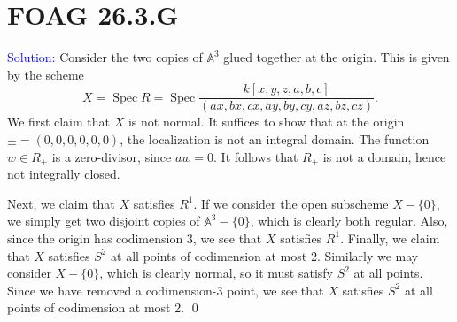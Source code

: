 \documentclass[11pt]{article}
\renewcommand{\AA}{\mathbb{A}}
\DeclareMathOperator{\Spec}{\operatorname{Spec}}
\newenvironment{solution}{\begin{trivlist}\item[]{\textcolor{blue}{Solution:}}}{\qed \end{trivlist}}
\begin{document}
\newpage

\section*{FOAG 26.3.G}

\begin{solution}
    Consider the two copies of $\AA^3$ glued together at the origin. This is given by the scheme 
    \[
        X = \Spec R = \Spec \frac{k[x,y,z,a,b,c]}{(ax, bx, cx, ay, by, cy, az, bz, cz)}.
    \]
    We first claim that $X$ is not normal. It suffices to show that at the origin $\pm = (0, 0, 0, 0, 0, 0)$, the localization is not an integral domain. The function $w \in R_{\pm}$ is a zero-divisor, since $aw = 0$. It follows that $R_{\pm}$ is not a domain, hence not integrally closed. 

    Next, we claim that $X$ satisfies $R^1$. If we consider the open subscheme $X - \{0\}$, we simply get two disjoint copies of $\AA^3 - \{0\}$, which is clearly both regular. Also, since the origin has codimension 3, we see that $X$ satisfies $R^1$. Finally, we claim that $X$ satisfies $S^2$ at all points of codimension at most 2. Similarly we may consider $X - \{0\}$, which is clearly normal, so it must satisfy $S^2$ at all points. Since we have removed a codimension-3 point, we see that $X$ satisfies $S^2$ at all points of codimension at most 2. 
\end{solution}
\end{document}
